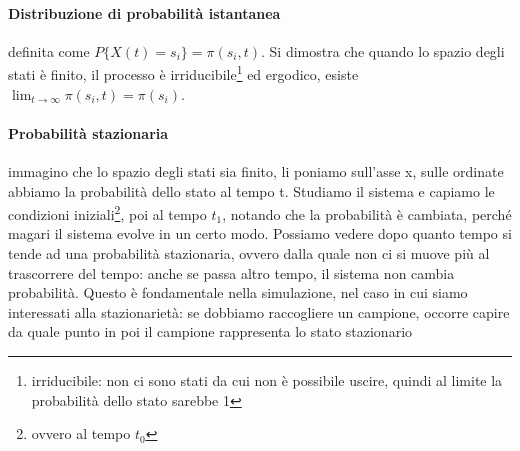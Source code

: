 \documentclass{article}
\begin{document}
\paragraph{Distribuzione di probabilità istantanea}definita come $P\{X(t) = s_i\} = \pi(s_i,t)$. Si dimostra che quando lo spazio degli stati è finito, il processo è irriducibile\footnote{irriducibile: non ci sono stati da cui non è possibile uscire, quindi al limite la probabilità dello stato sarebbe 1} ed ergodico, esiste $\lim_{t\rightarrow \infty} \pi(s_i,t) = \pi(s_i)$.
\paragraph{Probabilità stazionaria}immagino che lo spazio degli stati sia finito, li poniamo sull'asse x, sulle ordinate abbiamo la probabilità dello stato al tempo t. Studiamo il sistema e capiamo le condizioni iniziali\footnote{ovvero al tempo $t_0$}, poi al tempo $t_1$, notando che la probabilità è cambiata, perché magari il sistema evolve in un certo modo. Possiamo vedere dopo quanto tempo si tende ad una probabilità stazionaria, ovvero dalla quale non ci si muove più al trascorrere del tempo: anche se passa altro tempo, il sistema non cambia probabilità. Questo è fondamentale nella simulazione, nel caso in cui siamo interessati alla stazionarietà: se dobbiamo raccogliere un campione, occorre capire da quale punto in poi il campione rappresenta lo stato stazionario
\end{document}
